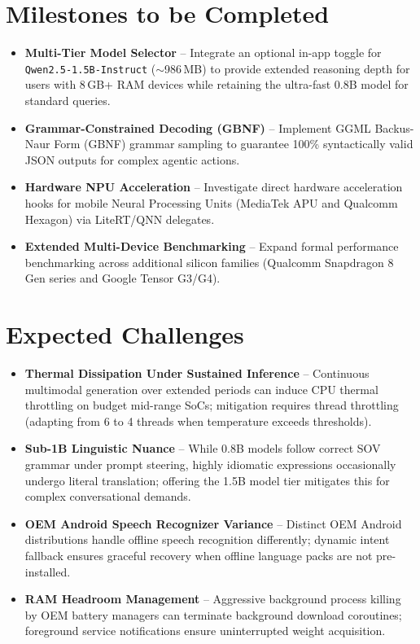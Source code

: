 \documentclass[11pt]{article}
\begin{document}
\section{Milestones to be Completed}
\begin{itemize}[leftmargin=1.4em, itemsep=2pt]
    \item \textbf{Multi-Tier Model Selector} -- Integrate an optional in-app toggle for
    \texttt{Qwen2.5-1.5B-Instruct} ($\sim$986\,MB) to provide extended reasoning depth for users
    with 8\,GB+ RAM devices while retaining the ultra-fast 0.8B model for standard queries.
    \item \textbf{Grammar-Constrained Decoding (GBNF)} -- Implement GGML Backus-Naur Form (GBNF)
    grammar sampling to guarantee 100\% syntactically valid JSON outputs for complex agentic actions.
    \item \textbf{Hardware NPU Acceleration} -- Investigate direct hardware acceleration hooks for
    mobile Neural Processing Units (MediaTek APU and Qualcomm Hexagon) via LiteRT/QNN delegates.
    \item \textbf{Extended Multi-Device Benchmarking} -- Expand formal performance benchmarking
    across additional silicon families (Qualcomm Snapdragon 8 Gen series and Google Tensor G3/G4).
\end{itemize}

\section{Expected Challenges}
\begin{itemize}[leftmargin=1.4em, itemsep=2pt]
    \item \textbf{Thermal Dissipation Under Sustained Inference} -- Continuous multimodal generation
    over extended periods can induce CPU thermal throttling on budget mid-range SoCs; mitigation
    requires thread throttling (adapting from 6 to 4 threads when temperature exceeds thresholds).
    \item \textbf{Sub-1B Linguistic Nuance} -- While 0.8B models follow correct SOV grammar under
    prompt steering, highly idiomatic expressions occasionally undergo literal translation; offering
    the 1.5B model tier mitigates this for complex conversational demands.
    \item \textbf{OEM Android Speech Recognizer Variance} -- Distinct OEM Android distributions
    handle offline speech recognition differently; dynamic intent fallback ensures graceful recovery
    when offline language packs are not pre-installed.
    \item \textbf{RAM Headroom Management} -- Aggressive background process killing by OEM battery
    managers can terminate background download coroutines; foreground service notifications ensure
    uninterrupted weight acquisition.
\end{itemize}
\end{document}
